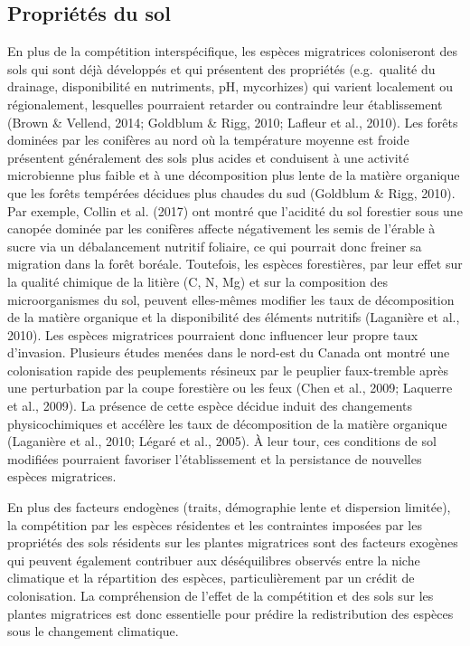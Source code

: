 \documentclass[
]{article}
\begin{document}
\hypertarget{propriuxe9tuxe9s-du-sol}{%
\subsection{Propriétés du sol}\label{propriuxe9tuxe9s-du-sol}}

En plus de la compétition interspécifique, les espèces migratrices
coloniseront des sols qui sont déjà développés et qui présentent des
propriétés (e.g.~qualité du drainage, disponibilité en nutriments, pH,
mycorhizes) qui varient localement ou régionalement, lesquelles
pourraient retarder ou contraindre leur établissement (Brown \& Vellend,
2014; Goldblum \& Rigg, 2010; Lafleur et al., 2010). Les forêts dominées
par les conifères au nord où la température moyenne est froide
présentent généralement des sols plus acides et conduisent à une
activité microbienne plus faible et à une décomposition plus lente de la
matière organique que les forêts tempérées décidues plus chaudes du sud
(Goldblum \& Rigg, 2010). Par exemple, Collin et al. (2017) ont montré
que l'acidité du sol forestier sous une canopée dominée par les
conifères affecte négativement les semis de l'érable à sucre via un
débalancement nutritif foliaire, ce qui pourrait donc freiner sa
migration dans la forêt boréale. Toutefois, les espèces forestières, par
leur effet sur la qualité chimique de la litière (C, N, Mg) et sur la
composition des microorganismes du sol, peuvent elles-mêmes modifier les
taux de décomposition de la matière organique et la disponibilité des
éléments nutritifs (Laganière et al., 2010). Les espèces migratrices
pourraient donc influencer leur propre taux d'invasion. Plusieurs études
menées dans le nord-est du Canada ont montré une colonisation rapide des
peuplements résineux par le peuplier faux-tremble après une perturbation
par la coupe forestière ou les feux (Chen et al., 2009; Laquerre et al.,
2009). La présence de cette espèce décidue induit des changements
physicochimiques et accélère les taux de décomposition de la matière
organique (Laganière et al., 2010; Légaré et al., 2005). À leur tour,
ces conditions de sol modifiées pourraient favoriser l'établissement et
la persistance de nouvelles espèces migratrices.

En plus des facteurs endogènes (traits, démographie lente et dispersion
limitée), la compétition par les espèces résidentes et les contraintes
imposées par les propriétés des sols résidents sur les plantes
migratrices sont des facteurs exogènes qui peuvent également contribuer
aux déséquilibres observés entre la niche climatique et la répartition
des espèces, particulièrement par un crédit de colonisation. La
compréhension de l'effet de la compétition et des sols sur les plantes
migratrices est donc essentielle pour prédire la redistribution des
espèces sous le changement climatique.
\end{document}
